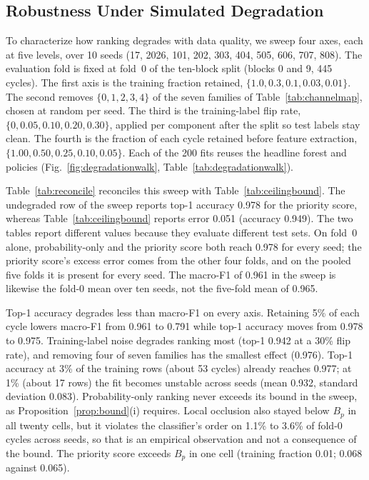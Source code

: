 \documentclass[journal]{IEEEtran}
\begin{document}


\subsection{Robustness Under Simulated Degradation}
\label{sec:degradationwalk}

To characterize how ranking degrades with data quality, we sweep four axes, each at
five levels, over 10 seeds (17, 2026, 101, 202, 303, 404, 505, 606, 707, 808). The evaluation fold is fixed at fold~0 of the ten-block split (blocks 0 and 9, 445 cycles).
The first axis is the training fraction retained, $\{1.0, 0.3, 0.1, 0.03, 0.01\}$.
The second removes $\{0,1,2,3,4\}$ of the seven families of Table~\ref{tab:channelmap},
chosen at random per seed. The third is the training-label flip rate,
$\{0,0.05,0.10,0.20,0.30\}$, applied per component after the split so test labels
stay clean. The fourth is the fraction of each cycle retained before feature
extraction, $\{1.00,0.50,0.25,0.10,0.05\}$. Each of the 200 fits reuses the headline
forest and policies (Fig.~\ref{fig:degradationwalk}, Table~\ref{tab:degradationwalk}).

Table~\ref{tab:reconcile} reconciles this sweep with Table~\ref{tab:ceilingbound}.
The undegraded row of the sweep reports top-1 accuracy 0.978 for the priority score,
whereas Table~\ref{tab:ceilingbound} reports error 0.051 (accuracy 0.949). The two tables report different values because they evaluate different test sets. On fold~0 alone, probability-only and the
priority score both reach 0.978 for every seed; the priority score's excess error
comes from the other four folds, and on the pooled five folds it is present for every
seed. The macro-F1 of 0.961 in the sweep is likewise the fold-0 mean over ten seeds,
not the five-fold mean of 0.965.

Top-1 accuracy degrades less than macro-F1 on every axis. Retaining 5\% of each cycle lowers
macro-F1 from 0.961 to 0.791 while top-1 accuracy moves from 0.978 to 0.975.
Training-label noise degrades ranking most (top-1 0.942 at a 30\% flip rate), and
removing four of seven families has the smallest effect (0.976). Top-1 accuracy at
3\% of the training rows (about 53 cycles) already reaches 0.977; at 1\% (about 17
rows) the fit becomes unstable across seeds (mean 0.932, standard deviation 0.083).
Probability-only ranking never exceeds its bound in the sweep, as
Proposition~\ref{prop:bound}(i) requires. Local occlusion also stayed below $B_p$
in all twenty cells, but it violates the classifier's order on 1.1\% to 3.6\% of
fold-0 cycles across seeds, so that is an empirical observation and not a
consequence of the bound. The priority score exceeds $B_p$ in one cell (training
fraction 0.01; 0.068 against 0.065).
\end{document}
